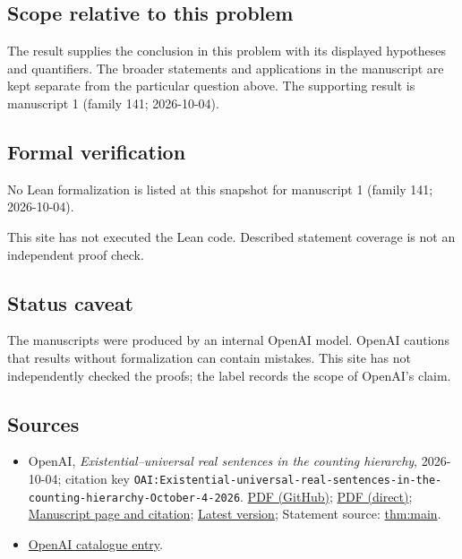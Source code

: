\documentclass[11pt]{article}
\begin{document}
\subsection{Scope relative to this problem}
The result supplies the conclusion in this problem with its displayed hypotheses and quantifiers. The broader statements and applications in the manuscript are kept separate from the particular question above. The supporting result is manuscript 1 (family 141; 2026-10-04).

\subsection{Formal verification}
No Lean formalization is listed at this snapshot for manuscript 1 (family 141; 2026-10-04).

This site has not executed the Lean code. Described statement coverage is not an independent proof check.

\subsection{Status caveat}
The manuscripts were produced by an internal OpenAI model. OpenAI cautions that results without formalization can contain mistakes. This site has not independently checked the proofs; the label records the scope of OpenAI's claim.

\subsection{Sources}
\begin{itemize}
\item OpenAI, \emph{Existential–universal real sentences in the counting hierarchy}, 2026-10-04; citation key \texttt{OAI:Existential-universal-real-sentences-in-the-counting-hierarchy-October-4-2026}. \href{https://github.com/openai/math/blob/adc7f1241b42e322a6451854ab7e4b4c146bf78a/preprints/Existential-universal-real-sentences-in-the-counting-hierarchy-October-4-2026/etr-counting-hierarchy.pdf}{PDF (GitHub)}; \href{https://github.com/openai/math/raw/adc7f1241b42e322a6451854ab7e4b4c146bf78a/preprints/Existential-universal-real-sentences-in-the-counting-hierarchy-October-4-2026/etr-counting-hierarchy.pdf}{PDF (direct)}; \href{https://github.com/openai/math/blob/adc7f1241b42e322a6451854ab7e4b4c146bf78a/preprints/Existential-universal-real-sentences-in-the-counting-hierarchy-October-4-2026/README.md}{Manuscript page and citation}; \href{https://github.com/openai/math/blob/main/preprints/Existential-universal-real-sentences-in-the-counting-hierarchy-October-4-2026/etr-counting-hierarchy.pdf}{Latest version}; Statement source: \href{https://github.com/openai/math/blob/adc7f1241b42e322a6451854ab7e4b4c146bf78a/preprints/Existential-universal-real-sentences-in-the-counting-hierarchy-October-4-2026/build/sections/01-introduction.tex\#L30}{thm:main}.
\item \href{https://github.com/openai/math/blob/adc7f1241b42e322a6451854ab7e4b4c146bf78a/CONTENTS.md}{OpenAI catalogue entry}.
\end{itemize}
\end{document}
